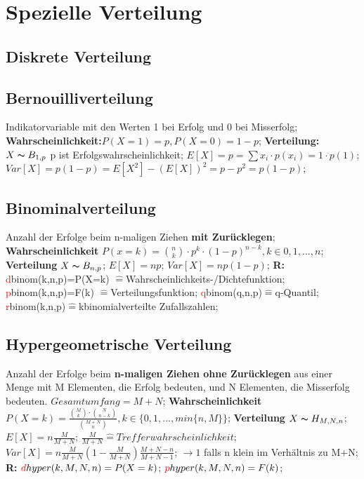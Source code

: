 \section{Spezielle Verteilung}
\subsection{Diskrete Verteilung}
\subsection{Bernouilliverteilung}
Indikatorvariable mit den Werten 1 bei Erfolg und 0 bei Misserfolg;
\textbf{Wahrscheinlichkeit:}$P(X=1) = p, P(X=0)  = 1 - p$; 
\textbf{Verteilung:} $X \thicksim B_{1,p}$ p ist Erfolgswahrscheinlichkeit; 
$E[X] = p = \sum x_{i} \cdot p(x_{i}) = 1 \cdot p(1)$; 
$Var[X] = p(1-p)  = E[X^2] -(E[X])^2 = p - p^2 = p(1-p)$; 
\subsection{Binominalverteilung}
Anzahl der Erfolge beim n-maligen Ziehen \textbf{mit Zurücklegen};
\textbf{Wahrscheinlichkeit} $ P(x = k ) =  \binom{n}{k} \cdot p^k \cdot (1-p)^{n-k}, k \in {0, 1, ..., n}$; 
\textbf{Verteilung} $ X \thicksim B_{n, p}$; 
$E[X] = np$; 
$ Var[X] = np(1-p) $; 
\textbf{R:}
\textcolor{red}{d}binom(k,n,p)=P(X=k) $\hat{=}$Wahrscheinlichkeits-/Dichtefunktion; 
\textcolor{red}{p}binom(k,n,p)=F(k) $\hat{=}$Verteilungsfunktion; 
\textcolor{red}{q}binom(q,n,p)$\hat{=}$q-Quantil; 
\textcolor{red}{r}binom(k,n,p)$\hat{=}$kbinomialverteilte Zufallszahlen; 
\subsection{Hypergeometrische Verteilung}
Anzahl der Erfolge beim \textbf{n-maligen Ziehen ohne Zurücklegen} aus einer Menge mit M Elementen, die Erfolg bedeuten, und N Elementen, die Misserfolg bedeuten. $Gesamtumfang = M + N$;
\textbf{Wahrscheinlichkeit}
$ P(X=k) = \frac{\binom{M}{k} \cdot \binom{N}{n-k}}{\binom{M+N}{n}}, k \in \{0, 1, ..., min\{n,M\}\}$;
\textbf{Verteilung} $ X \thicksim H_{M, N, n}$; $E[X] = n \frac{M}{M+N}$; $\frac{M}{M+N} \hat{=} Trefferwahrscheinlichkeit$; $Var[X] = n \frac{M}{M+N}( 1 - \frac{M}{M+N}) \frac{M+N-n}{M+N-1}$; $\rightarrow 1$ falls n klein im Verhältnis zu M+N;
\textbf{R:}
$\textcolor{red}{d}hyper(k,M,N,n)=P(X=k)$;
$\textcolor{red}{p}hyper(k,M,N,n)=F(k)$;
